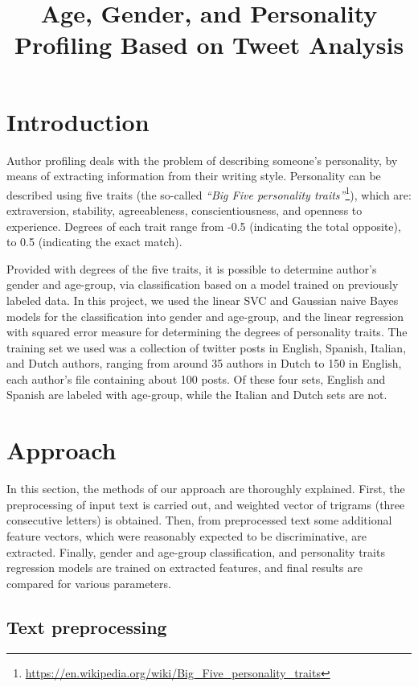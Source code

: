 \documentclass[10pt, a4paper]{article}
\title{Age, Gender, and Personality Profiling Based on Tweet Analysis}
\begin{document}
\maketitleabstract

\section{Introduction}

Author profiling deals with the problem of describing someone's personality, by means of extracting information from their writing style.
Personality can be described using five traits (the so-called \textit{``Big Five personality traits''}\footnote{\url{https://en.wikipedia.org/wiki/Big_Five_personality_traits}}), which are: extraversion, stability, agreeableness, conscientiousness, and openness to experience.
Degrees of each trait range from -0.5 (indicating the total opposite), to 0.5 (indicating the exact match).

Provided with degrees of the five traits, it is possible to determine author's gender and age-group, via classification based on a model trained on previously labeled data.
In this project, we used the linear SVC and Gaussian naive Bayes models for the classification into gender and age-group, and the linear regression with squared error measure for determining the degrees of personality traits.
The training set we used was a collection of twitter posts in English, Spanish, Italian, and Dutch authors, ranging from around 35 authors in Dutch to 150 in English, each author's file containing about 100 posts.
Of these four sets, English and Spanish are labeled with age-group, while the Italian and Dutch sets are not.

\section{Approach}

In this section, the methods of our approach are thoroughly explained.
First, the preprocessing of input text is carried out, and weighted vector of trigrams (three consecutive letters) is obtained.
Then, from preprocessed text some additional feature vectors, which were reasonably expected to be discriminative, are extracted.
Finally, gender and age-group classification, and personality traits regression models are trained on extracted features, and final results are compared for various parameters.

\subsection{Text preprocessing}
\end{document}
